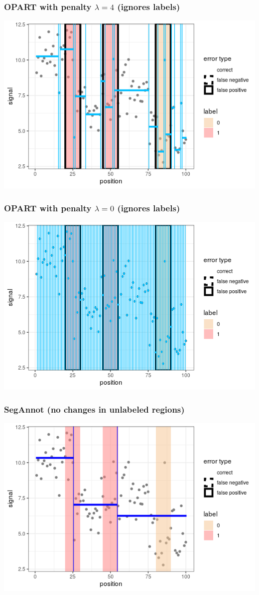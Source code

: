 \begin{frame}
  \frametitle{OPART with penalty $\lambda=4$ (ignores labels)}
  \includegraphics[width=\textwidth]{figure-baselines-penalty=4.png}
\end{frame}


\begin{frame}
  \frametitle{OPART with penalty $\lambda=0$ (ignores labels)}
  \includegraphics[width=\textwidth]{figure-baselines-penalty=0.png}
\end{frame}


\begin{frame}
  \frametitle{SegAnnot (no changes in unlabeled regions)}
  \includegraphics[width=\textwidth]{figure-baselines-penalty=Inf.png}
\end{frame}
